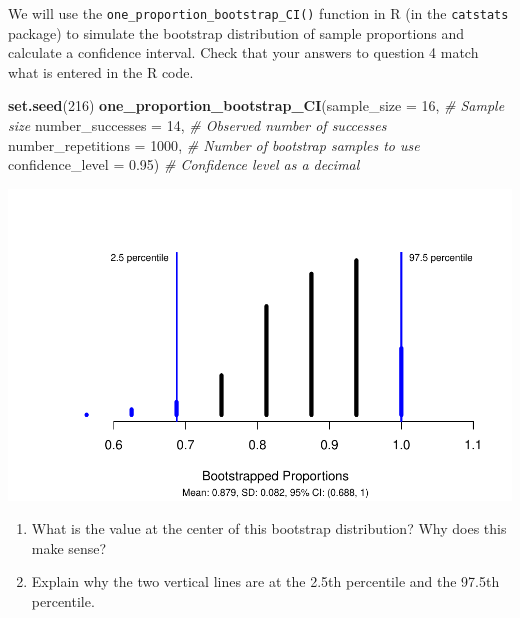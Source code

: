 \documentclass[
]{report}
\newenvironment{Shaded}{\begin{snugshade}}{\end{snugshade}}
\newcommand{\AttributeTok}[1]{\textcolor[rgb]{0.13,0.29,0.53}{#1}}
\newcommand{\CommentTok}[1]{\textcolor[rgb]{0.56,0.35,0.01}{\textit{#1}}}
\newcommand{\DecValTok}[1]{\textcolor[rgb]{0.00,0.00,0.81}{#1}}
\newcommand{\FloatTok}[1]{\textcolor[rgb]{0.00,0.00,0.81}{#1}}
\newcommand{\FunctionTok}[1]{\textcolor[rgb]{0.13,0.29,0.53}{\textbf{#1}}}
\newcommand{\NormalTok}[1]{#1}
\begin{document}
We will use the \texttt{one\_proportion\_bootstrap\_CI()} function in R (in the \texttt{catstats} package) to simulate the bootstrap distribution of sample proportions and calculate a confidence interval. Check that your answers to question 4 match what is entered in the R code.

\begin{Shaded}
\begin{Highlighting}[]
\FunctionTok{set.seed}\NormalTok{(}\DecValTok{216}\NormalTok{)}
\FunctionTok{one\_proportion\_bootstrap\_CI}\NormalTok{(}\AttributeTok{sample\_size =} \DecValTok{16}\NormalTok{, }\CommentTok{\# Sample size}
                    \AttributeTok{number\_successes =} \DecValTok{14}\NormalTok{, }\CommentTok{\# Observed number of successes}
                    \AttributeTok{number\_repetitions =} \DecValTok{1000}\NormalTok{, }\CommentTok{\# Number of bootstrap samples to use}
                    \AttributeTok{confidence\_level =} \FloatTok{0.95}\NormalTok{) }\CommentTok{\# Confidence level as a decimal}
\end{Highlighting}
\end{Shaded}

\begin{center}\includegraphics[width=0.7\linewidth]{06-OCA04-inference-1cat_test-simulation-S24_files/figure-latex/unnamed-chunk-2-1} \end{center}

\begin{enumerate}
\def\labelenumi{\arabic{enumi}.}
\setcounter{enumi}{4}
\item
  What is the value at the center of this bootstrap distribution? Why does this make sense?
  \vspace{.8in}
\item
  Explain why the two vertical lines are at the 2.5th percentile and the 97.5th percentile.
\end{enumerate}

\vspace{.7in}
\end{document}
